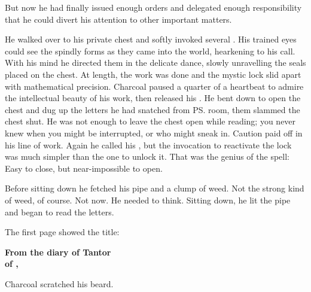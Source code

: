 But now he had finally issued enough orders and delegated enough responsibility that he could divert his attention to other important matters. 

He walked over to his private chest and softly invoked several . His trained eyes could see the  spindly forms as they came into the world, hearkening to his call. With his mind he directed them in the delicate dance, slowly unravelling the seals placed on the chest. At length, the work was done and the mystic lock slid apart with mathematical precision. Charcoal paused a quarter of a heartbeat to admire the intellectual beauty of his work, then released his \Qliphoth. He bent down to open the chest and dug up the letters he had snatched from \ps{\Onatol}{} room, them slammed the chest shut. He was not \naive{} enough to leave the chest open while reading; you never knew when you might be interrupted, or who might sneak in. Caution paid off in his line of work. Again he called his \Qliphoth, but the invocation to reactivate the lock was much simpler than the one to unlock it. That was the genius of the spell: Easy to close, but near-impossible to open. 

Before sitting down he fetched his pipe and a clump of weed. Not the strong kind of weed, of course. Not now. He needed to think. Sitting down, he lit the pipe and began to read the letters. 


The first page showed the title: 







\begin{diary}%
  \bf From the diary of \Jirad{} Tantor\\
   of , 
\end{diary}







\noindent
Charcoal scratched his beard. 







